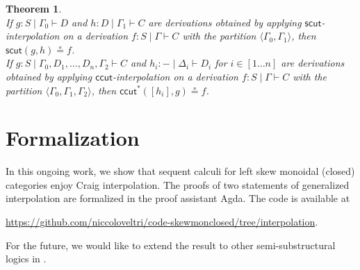\documentclass[sn-mathphys-num]{sn-jnl}%
\newcommand{\GG}{\Gamma}
\newcommand{\GD}{\Delta}
\newcommand{\vd}{\vdash}
\newcommand{\mf}[1]{\mathsf{#1}}
\theoremstyle{thmstyleone}%
\newtheorem{theorem}{Theorem}%
\theoremstyle{thmstyletwo}%
\theoremstyle{thmstylethree}%
\begin{document}
\begin{theorem}
~
\\
  If $g : S \mid \GG_0 \vd D$ and $h : D \mid \GG_1 \vd C$ are derivations obtained by applying $\mf{scut}$-interpolation on a derivation $f: S \mid \GG \vd C$ with the partition $\langle \GG_0 , \GG_1 \rangle$, then $\mf{scut}(g, h) \circeq f$.
  \\
  If $g : S \mid \GG_0 , D_1 , \dots, D_n, \GG_2 \vd C$ and $h_i : {-} \mid \GD_i \vd D_i$ for $i \in [1 \dots n]$ are derivations obtained by applying $\mf{ccut}$-interpolation on a derivation $f: S \mid \GG \vd C$ with the partition $\langle \GG_0 , \GG_1 , \GG_2 \rangle$, then $\mf{ccut}^*([h_i] , g) \circeq f$.
\end{theorem}
\section{Formalization}
In this ongoing work, we show that sequent calculi for left skew monoidal (closed) categories enjoy Craig interpolation.
The proofs of two statements of generalized interpolation are formalized in the proof assistant Agda.
The code is available at
\begin{center}
  \url{https://github.com/niccoloveltri/code-skewmonclosed/tree/interpolation}.
\end{center}
For the future, we would like to extend the result to other semi-substructural logics in \cite{veltri:coherence:2021,VW:2023}.






\end{document}
